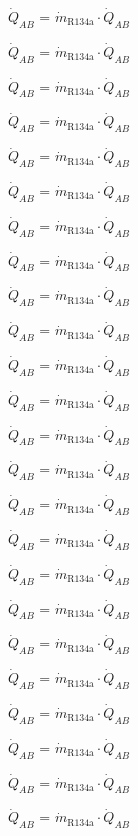 \( \dot{Q}_{AB} \) = \( \dot{m}_{\text{R134a}} \cdot \dot{Q}_{AB} \)  

\( \dot{Q}_{AB} \) = \( \dot{m}_{\text{R134a}} \cdot \dot{Q}_{AB} \)  

\( \dot{Q}_{AB} \) = \( \dot{m}_{\text{R134a}} \cdot \dot{Q}_{AB} \)  

\( \dot{Q}_{AB} \) = \( \dot{m}_{\text{R134a}} \cdot \dot{Q}_{AB} \)  

\( \dot{Q}_{AB} \) = \( \dot{m}_{\text{R134a}} \cdot \dot{Q}_{AB} \)  

\( \dot{Q}_{AB} \) = \( \dot{m}_{\text{R134a}} \cdot \dot{Q}_{AB} \)  

\( \dot{Q}_{AB} \) = \( \dot{m}_{\text{R134a}} \cdot \dot{Q}_{AB} \)  

\( \dot{Q}_{AB} \) = \( \dot{m}_{\text{R134a}} \cdot \dot{Q}_{AB} \)  

\( \dot{Q}_{AB} \) = \( \dot{m}_{\text{R134a}} \cdot \dot{Q}_{AB} \)  

\( \dot{Q}_{AB} \) = \( \dot{m}_{\text{R134a}} \cdot \dot{Q}_{AB} \)  

\( \dot{Q}_{AB} \) = \( \dot{m}_{\text{R134a}} \cdot \dot{Q}_{AB} \)  

\( \dot{Q}_{AB} \) = \( \dot{m}_{\text{R134a}} \cdot \dot{Q}_{AB} \)  

\( \dot{Q}_{AB} \) = \( \dot{m}_{\text{R134a}} \cdot \dot{Q}_{AB} \)  

\( \dot{Q}_{AB} \) = \( \dot{m}_{\text{R134a}} \cdot \dot{Q}_{AB} \)  

\( \dot{Q}_{AB} \) = \( \dot{m}_{\text{R134a}} \cdot \dot{Q}_{AB} \)  

\( \dot{Q}_{AB} \) = \( \dot{m}_{\text{R134a}} \cdot \dot{Q}_{AB} \)  

\( \dot{Q}_{AB} \) = \( \dot{m}_{\text{R134a}} \cdot \dot{Q}_{AB} \)  

\( \dot{Q}_{AB} \) = \( \dot{m}_{\text{R134a}} \cdot \dot{Q}_{AB} \)  

\( \dot{Q}_{AB} \) = \( \dot{m}_{\text{R134a}} \cdot \dot{Q}_{AB} \)  

\( \dot{Q}_{AB} \) = \( \dot{m}_{\text{R134a}} \cdot \dot{Q}_{AB} \)  

\( \dot{Q}_{AB} \) = \( \dot{m}_{\text{R134a}} \cdot \dot{Q}_{AB} \)  

\( \dot{Q}_{AB} \) = \( \dot{m}_{\text{R134a}} \cdot \dot{Q}_{AB} \)  

\( \dot{Q}_{AB} \) = \( \dot{m}_{\text{R134a}} \cdot \dot{Q}_{AB} \)  

\( \dot{Q}_{AB} \) = \( \dot{m}_{\text{R134a}} \cdot \dot{Q}_{AB} \)  

